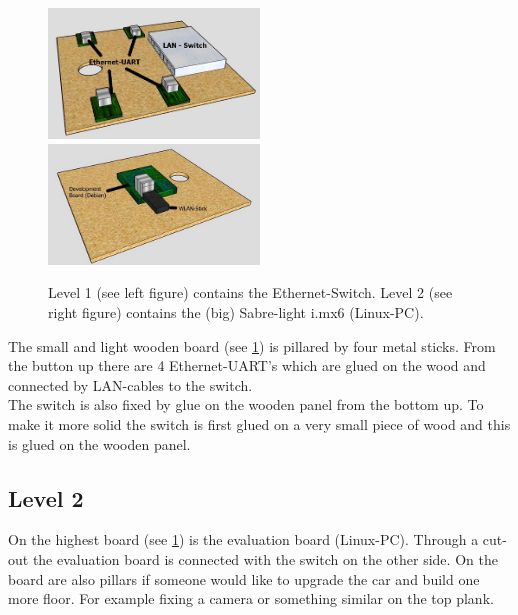 \begin{figure}[ht] 
	\includegraphics[width=0.5\textwidth]{figures/level1_b.jpg}
	\includegraphics[width=0.5\textwidth]{figures/level2_b.jpg}
	\caption{Level 1 (see left figure) contains the Ethernet-Switch. Level 2 (see right figure) contains the (big) Sabre-light i.mx6 (Linux-PC).} \label{Level1and2}
\end{figure}

The small and light wooden board (see \ref{Level1and2}) is pillared by four metal sticks. From the button up there are 4 Ethernet-UART’s which are glued on the wood and connected by LAN-cables to the switch.\\

The switch is also fixed by glue on the wooden panel from the bottom up. To make it more solid the switch is first glued on a very small piece of wood and this is glued on the wooden panel.

\subsection{Level 2}

On the highest board (see \ref{Level1and2}) is the evaluation board (Linux-PC). Through a cut-out the evaluation board is connected with the switch on the other side. On the board are also pillars if someone would like to upgrade the car and build one more floor. For example fixing a camera or something similar on the top plank.
